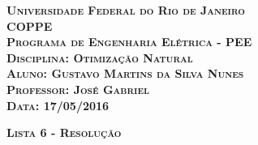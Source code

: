 \begin{titlepage}
\begin{flushleft}

\textsc{\textbf{\LARGE Universidade Federal do Rio de Janeiro}}\\[0.5cm]
\textsc{\textbf{\LARGE COPPE}}\\[0.5cm]
\textsc{\textbf{\LARGE Programa de Engenharia Elétrica - PEE}}\\[0.5cm]
\textsc{\textbf{\LARGE Disciplina: Otimização Natural}}\\[0.5cm]
\textsc{\textbf{\LARGE Aluno: Gustavo Martins da Silva Nunes}}\\[0.5cm]
\textsc{\textbf{\LARGE Professor: José Gabriel}}\\[0.5cm]
\textsc{\textbf{\LARGE Data: 17/05/2016}}\\[6.5cm]

\end{flushleft}
\begin{center}
\textsc{\textbf{\huge Lista 6 - Resolução}}
\vfill
\end{center}
\end{titlepage}